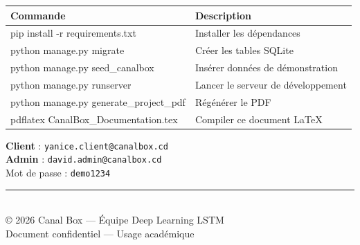 \documentclass[11pt,a4paper]{article}
\begin{document}
\begin{table}[h]
  \centering
  \renewcommand{\arraystretch}{1.35}
  \begin{tabularx}{\textwidth}{>{\ttfamily\small}l X}
    \toprule
    \rowcolor{cbPos}\color{white}\bfseries Commande & \color{white}\bfseries Description \\
    \midrule
    pip install -r requirements.txt & Installer les dépendances \\
    python manage.py migrate & Créer les tables SQLite \\
    python manage.py seed\_canalbox & Insérer données de démonstration \\
    python manage.py runserver & Lancer le serveur de développement \\
    python manage.py generate\_project\_pdf & Régénérer le PDF \\
    pdflatex CanalBox\_Documentation.tex & Compiler ce document LaTeX \\
    \bottomrule
  \end{tabularx}
\end{table}

\begin{infobox}
  \textbf{Client} : \texttt{yanice.client@canalbox.cd} \\
  \textbf{Admin} : \texttt{david.admin@canalbox.cd} \\
  Mot de passe : \texttt{demo1234}
\end{infobox}

\vfill
\begin{center}
  \color{cbMist}\small
  \rule{0.3\textwidth}{2pt}\\[0.5em]
  © 2026 Canal Box — Équipe Deep Learning LSTM\\
  Document confidentiel — Usage académique
\end{center}
\end{document}
